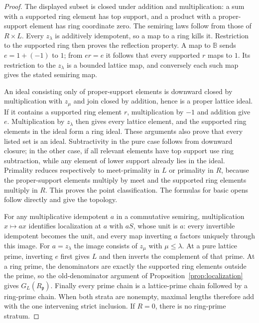 \documentclass[11pt]{amsart}
\newcommand{\B}{\mathbb B}
\theoremstyle{definition}
\theoremstyle{remark}
\begin{document}
\begin{proof}
The displayed subset is closed under addition and multiplication: a sum with a supported ring element has top support, and a product with a proper-support element has ring coordinate zero. The semiring laws follow from those of $R\times L$. Every $z_\lambda$ is additively idempotent, so a map to a ring kills it. Restriction to the supported ring then proves the reflection property. A map to $\B$ sends $e=1+(-1)$ to $1$; from $er=e$ it follows that every supported $r$ maps to $1$. Its restriction to the $z_\lambda$ is a bounded lattice map, and conversely each such map gives the stated semiring map.

An ideal consisting only of proper-support elements is downward closed by multiplication with $z_\mu$ and join closed by addition, hence is a proper lattice ideal. If it contains a supported ring element $r$, multiplication by $-1$ and addition give $e$. Multiplication by $z_\lambda$ then gives every lattice element, and the supported ring elements in the ideal form a ring ideal. These arguments also prove that every listed set is an ideal. Subtractivity in the pure case follows from downward closure; in the other case, if all relevant elements have top support use ring subtraction, while any element of lower support already lies in the ideal. Primality reduces respectively to meet-primality in $L$ or primality in $R$, because the proper-support elements multiply by meet and the supported ring elements multiply in $R$. This proves the point classification. The formulas for basic opens follow directly and give the topology.

For any multiplicative idempotent $a$ in a commutative semiring, multiplication $x\mapsto ax$ identifies localization at $a$ with $aS$, whose unit is $a$: every invertible idempotent becomes the unit, and every map inverting $a$ factors uniquely through this image. For $a=z_\lambda$ the image consists of $z_\mu$ with $\mu\le\lambda$. At a pure lattice prime, inverting $e$ first gives $L$ and then inverts the complement of that prime. At a ring prime, the denominators are exactly the supported ring elements outside the prime, so the old-denominator argument of Proposition~\ref{prop:localization} gives $G_L(R_{\mathfrak p})$. Finally every prime chain is a lattice-prime chain followed by a ring-prime chain. When both strata are nonempty, maximal lengths therefore add with the one intervening strict inclusion. If $R=0$, there is no ring-prime stratum.
\end{proof}
\end{document}
